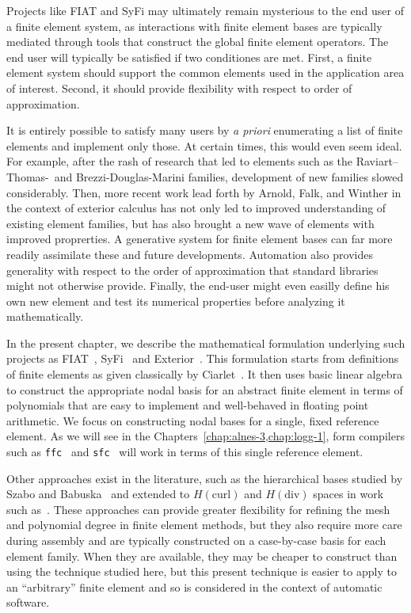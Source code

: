 Projects like FIAT and SyFi may ultimately remain
mysterious to the end user of a
finite element system, as
interactions with finite element bases are typically mediated through
tools that construct the global finite element operators.
The end user will typically be satisfied if two conditiones are met.
First, a finite element system
should support the common elements used in the application
area of interest.  Second, it should provide flexibility with respect
to order of approximation.

It is entirely possible to satisfy many users by \emph{a priori}
enumerating a list of finite elements and implement only those.  At certain times, this
would even seem ideal.  For example, after the rash of research
that led to elements such as the Raviart--Thomas-\nedelec\ and
Brezzi-Douglas-Marini families, development of new families slowed
considerably.  Then, more recent work lead forth by  Arnold, Falk, and Winther in the context of exterior
calculus has not only led to
improved understanding of existing element families, but has also
brought a new wave of elements with improved proprerties.  A
generative system for finite element bases can far more
readily assimilate these and future developments.
Automation also provides generality with respect to the order of approximation that standard libraries
might not otherwise provide. Finally, the end-user might even easilly define his own new element
and test its numerical properties before analyzing it mathematically.


In the present chapter, we describe the mathematical formulation
underlying such projects as FIAT~\citep{Kirby2004,Kirby2006},
SyFi~\citep{AlnaesMardal2009,AlnaesMardal2009a} and Exterior~\citep{LoggMardal2009}.
This formulation starts from definitions of finite elements as
given classically by Ciarlet~\citep{Ciarlet2002}.  It then uses basic linear
algebra to construct the appropriate nodal basis for an abstract
finite element in terms of polynomials that are easy to implement and
well-behaved in floating point arithmetic.  We focus on
constructing nodal bases for a single, fixed reference element.  As we
will see in the Chapters~\ref{chap:alnes-3,chap:logg-1}, form compilers such as
\texttt{ffc}~\cite{Logg2007b} and \texttt{sfc}~\cite{Alnaes2009} will work
in terms of this single reference element.


Other approaches exist in the literature, such as the hierarchical
bases studied by Szabo and Babuska~\citep{SzaboBabuska1991} and extended to \(
H(\mathrm{curl}) \) and \( H(\mathrm{div}) \) spaces in work such
as~\citep{AinCoy2002}.  These approaches can provide greater flexibility for
refining the mesh and polynomial degree in finite element methods, but
they also require more care during assembly and are typically constructed
on a case-by-case basis for each element family.  When they are
available, they may be cheaper to construct than using the technique
studied here, but this present technique is easier to apply to an
``arbitrary'' finite element and so is considered in the context of
automatic software.


